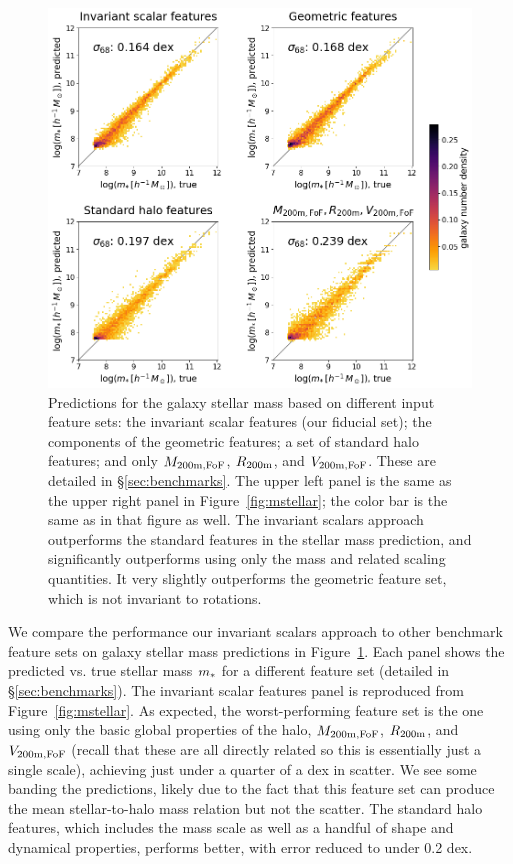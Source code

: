 \begin{figure}
    \centering
    \includegraphics[width=0.7\columnwidth]{feature_comparison_mstellar.png}
    \caption{Predictions for the galaxy stellar mass based on different input feature sets: the invariant scalar features (our fiducial set); the components of the geometric features; a set of standard halo features; and only $M_\mathrm{200m,FoF}$, $R_\mathrm{200m}$, and $V_\mathrm{200m,FoF}$. These are detailed in \S\ref{sec:benchmarks}. The upper left panel is the same as the upper right panel in Figure~\ref{fig:mstellar}; the color bar is the same as in that figure as well. The invariant scalars approach outperforms the standard features in the stellar mass prediction, and significantly outperforms using only the mass and related scaling quantities. It very slightly outperforms the geometric feature set, which is not invariant to rotations.}
    \label{fig:mstellar_compare}
\end{figure}

We compare the performance our invariant scalars approach to other benchmark feature sets on galaxy stellar mass predictions in Figure~\ref{fig:mstellar_compare}.
Each panel shows the predicted vs. true stellar mass $m_*$ for a different feature set (detailed in \S\ref{sec:benchmarks}).
The invariant scalar features panel is reproduced from Figure~\ref{fig:mstellar}.
As expected, the worst-performing feature set is the one using only the basic global properties of the halo, $M_\mathrm{200m,FoF}$, $R_\mathrm{200m}$, and $V_\mathrm{200m,FoF}$ (recall that these are all directly related so this is essentially just a single scale), achieving just under a quarter of a dex in scatter.
We see some banding the predictions, likely due to the fact that this feature set can produce the mean stellar-to-halo mass relation but not the scatter.
The standard halo features, which includes the mass scale as well as a handful of shape and dynamical properties, performs better, with error reduced to under 0.2 dex. 


